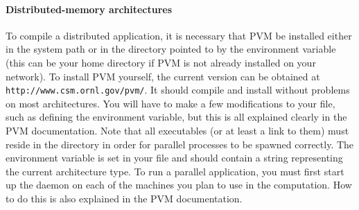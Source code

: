 \paragraph{Distributed-memory architectures}
\label{distributed-build}

\label{PVM}
To compile a distributed application, it is necessary that PVM be installed
either in the system path or in the directory pointed to by the environment
variable  (this can be your home directory if PVM is not
already installed on your network). To install PVM yourself, the current
version can be obtained at \texttt{
{http://www.csm.ornl.gov/pvm/}}. It should compile and install without
problems on most architectures. You will have to make a few modifications to
your  file, such as defining the  environment
variable, but this is all explained clearly in the PVM documentation. Note
that all executables (or at least a link to them) must reside in the
 directory in order for parallel processes
to be spawned correctly. The environment variable  is set in
your  file and should contain a string representing the current
architecture type. To run a parallel application, you must first start up the
daemon on each of the machines you plan to use in the computation. How to do
this is also explained in the PVM documentation.


